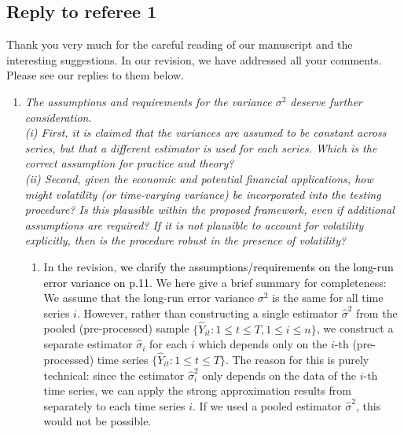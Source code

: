 \documentclass[a4paper,12pt]{article}
\newcommand{\reference}[1]{\textcolor{black}{#1}}
\begin{document}
\subsection*{Reply to referee 1}


Thank you very much for the careful reading of our manuscript and the interesting suggestions. In our revision, we have addressed all your comments. Please see our replies to them below.
\begin{enumerate}[label=\arabic*.,leftmargin=0.6cm]


\item \textit{The assumptions and requirements for the variance $\sigma^2$ deserve further consideration. \\
(i) First, it is claimed that the variances are assumed to be constant across series, but that a different estimator is used for each series. Which is the correct assumption for practice and theory? \\
(ii) Second, given the economic and potential financial applications, how might volatility (or time-varying variance) be incorporated into the testing procedure? Is this plausible within the proposed framework, even if additional assumptions are required? If it is not plausible to account for volatility explicitly, then is the procedure robust in the presence of volatility? }

\begin{enumerate}[label=(\roman*),leftmargin=0.75cm,topsep=0pt]

\item In the revision, \reference{we clarify the assumptions/requirements on the long-run error variance on p.11}. We here give a brief summary for completeness: 
We assume that the long-run error variance $\sigma^2$ is the same for all time series $i$. However, rather than constructing a single estimator $\widehat{\sigma}^2$ from the pooled (pre-processed) sample $\{ \widehat{Y}_{it}: 1 \le t \le T, 1 \le i \le n \}$, we construct a separate estimator $\widehat{\sigma}_i$ for each $i$ which depends only on the $i$-th (pre-processed) time series $\{ \widehat{Y}_{it}: 1 \le t \le T\}$. The reason for this is purely technical: since the estimator $\widehat{\sigma}_i^2$ only depends on the data of the $i$-th time series, we can apply the strong approximation results from \cite{BerkesLiuWu2014} separately to each time series $i$. If we used a pooled estimator $\widehat{\sigma}^2$, this would not be possible. 
 

\end{enumerate}
\end{enumerate}
\end{document}
